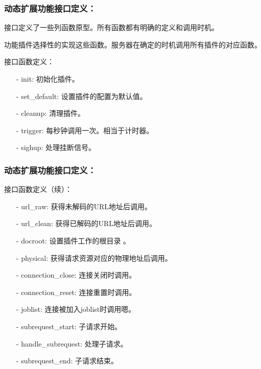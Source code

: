 \documentclass[10pt,dvipdfm]{beamer}
\begin{document}
\begin{frame}
	\frametitle{动态扩展功能接口定义：}
	接口定义了一些列函数原型。所有函数都有明确的定义和调用时机。
	
	功能插件选择性的实现这些函数。服务器在确定的时机调用所有插件的对应函数。
	
	\pause
	
	\begin{block}{接口函数定义：}
	\begin{itemize}
		\item[-] init: 初始化插件。
		\item[-] set\_default: 设置插件的配置为默认值。
		\item[-] cleanup: 清理插件。
		\item[-] trigger: 每秒钟调用一次。相当于计时器。
		\item[-] sighup: 处理挂断信号。
	\end{itemize}
	\end{block}
\end{frame}

\begin{frame}
	\frametitle{动态扩展功能接口定义：}
	\begin{block}{接口函数定义（续）：}
	\begin{itemize}
		\item[-] url\_raw: 获得未解码的URL地址后调用。
		\item[-] url\_clean: 获得已解码的URL地址后调用。
		\item[-] docroot: 设置插件工作的根目录 。
		\item[-] physical: 获得请求资源对应的物理地址后调用。
		\item[-] connection\_close: 连接关闭时调用。
		\item[-] connection\_reset: 连接重置时调用。
		\item[-] joblist: 连接被加入joblist时调用嗯。
		\item[-] subrequest\_start: 子请求开始。
		\item[-] handle\_subrequest: 处理子请求。
		\item[-] subrequest\_end: 子请求结束。
	\end{itemize}
	\end{block}
\end{frame}
\end{document}
